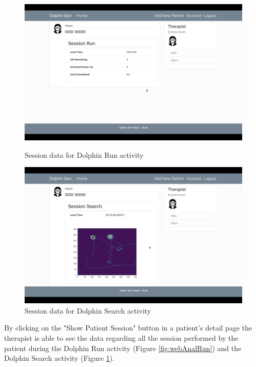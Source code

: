\begin{figure}[h]
	\centering
	\begin{minipage}[b]{0.4\textwidth}
		\includegraphics[width=\textwidth]{images/UX/website/11-runAnal}
		\caption{Session data for Dolphin Run activity}
		\label{fig:webAnalRun}
	\end{minipage}
	\begin{minipage}[b]{0.4\textwidth}
		\includegraphics[width=\textwidth]{images/UX/website/12-searchAnal}
		\caption{Session data for Dolphin Search activity}
		\label{fig:webAnalSearch}
	\end{minipage}
\end{figure}

By clicking on the "Show Patient Session" button in a patient's detail page the therapist is able to see the data regarding all the session performed by the patient during the Dolphin Run activity (Figure \ref{fig:webAnalRun}) and the Dolphin Search activity (Figure \ref{fig:webAnalSearch}).



